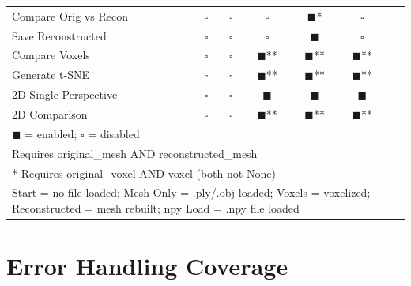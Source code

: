 \documentclass[12pt,a4paper]{article}
\begin{document}
\begin{longtable}{lcccccc}
Compare Orig vs Recon & $\square$ & $\square$ & $\square$ & $\blacksquare$* & $\square$ \\
Save Reconstructed & $\square$ & $\square$ & $\square$ & $\blacksquare$ & $\square$ \\
Compare Voxels & $\square$ & $\square$ & $\blacksquare$** & $\blacksquare$** & $\blacksquare$** \\
Generate t-SNE & $\square$ & $\square$ & $\blacksquare$** & $\blacksquare$** & $\blacksquare$** \\
2D Single Perspective & $\square$ & $\square$ & $\blacksquare$ & $\blacksquare$ & $\blacksquare$ \\
2D Comparison & $\square$ & $\square$ & $\blacksquare$** & $\blacksquare$** & $\blacksquare$** \\
\bottomrule
\multicolumn{7}{l}{\footnotesize $\blacksquare$ = enabled; $\square$ = disabled} \\
\multicolumn{7}{l}{\footnotesize * Requires original\_mesh AND reconstructed\_mesh} \\
\multicolumn{7}{l}{\footnotesize ** Requires original\_voxel AND voxel (both not None)} \\
\multicolumn{7}{l}{\footnotesize Start = no file loaded; Mesh Only = .ply/.obj loaded; Voxels = voxelized; Reconstructed = mesh rebuilt; npy Load = .npy file loaded}
\end{longtable}
\normalsize

\section{Error Handling Coverage}
\end{document}
